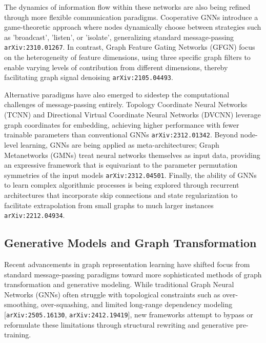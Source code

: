 \documentclass[11pt]{article}
\begin{document}
The dynamics of information flow within these networks are also being refined through more flexible communication paradigms. Cooperative GNNs introduce a game-theoretic approach where nodes dynamically choose between strategies such as 'broadcast', 'listen', or 'isolate', generalizing standard message-passing \texttt{arXiv:2310.01267}. In contrast, Graph Feature Gating Networks (GFGN) focus on the heterogeneity of feature dimensions, using three specific graph filters to enable varying levels of contribution from different dimensions, thereby facilitating graph signal denoising \texttt{arXiv:2105.04493}.

Alternative paradigms have also emerged to sidestep the computational challenges of message-passing entirely. Topology Coordinate Neural Networks (TCNN) and Directional Virtual Coordinate Neural Networks (DVCNN) leverage graph coordinates for embedding, achieving higher performance with fewer trainable parameters than conventional GNNs \texttt{arXiv:2312.01342}. Beyond node-level learning, GNNs are being applied as meta-architectures; Graph Metanetworks (GMNs) treat neural networks themselves as input data, providing an expressive framework that is equivariant to the parameter permutation symmetries of the input models \texttt{arXiv:2312.04501}. Finally, the ability of GNNs to learn complex algorithmic processes is being explored through recurrent architectures that incorporate skip connections and state regularization to facilitate extrapolation from small graphs to much larger instances \texttt{arXiv:2212.04934}.

\subsection{Generative Models and Graph Transformation}

Recent advancements in graph representation learning have shifted focus from standard message-passing paradigms toward more sophisticated methods of graph transformation and generative modeling. While traditional Graph Neural Networks (GNNs) often struggle with topological constraints such as over-smoothing, over-squashing, and limited long-range dependency modeling [\texttt{arXiv:2505.16130}, \texttt{arXiv:2412.19419}], new frameworks attempt to bypass or reformulate these limitations through structural rewriting and generative pre-training.
\end{document}
